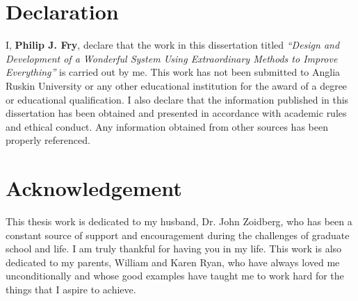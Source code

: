 \documentclass[12pt, twoside]{report}
\begin{document}


\chapter*{Declaration}

I, \textbf{Philip J. Fry}, declare that the work in this dissertation titled \textit{“Design and Development of a Wonderful System Using Extraordinary Methods to Improve Everything”} is carried out by me. This work has not been submitted to Anglia Ruskin University or any other educational institution for the award of a degree or educational qualification. I also declare that the information published in this dissertation has been obtained and presented in accordance with academic rules and ethical conduct. Any information obtained from other sources has been properly referenced. 


\chapter*{Acknowledgement}

This thesis work is dedicated to my husband, Dr. John Zoidberg, who has been a constant source of support and encouragement during the challenges of graduate school and life. I am truly thankful for having you in my life. This work is also dedicated to my parents, William and Karen Ryan, who have always loved me unconditionally and whose good examples have taught me to work hard for the things that I aspire to achieve.
\tableofcontents
\listoffigures
\listoftables
\end{document}

